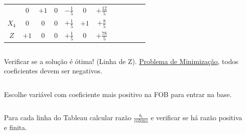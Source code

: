 \documentclass{beamer}
\begin{document}
\begin{frame}
{\begin{table}
\begin{tabular}{c c c c c c c c c c c c}
				& \cellcolor{yellow!50} $\scriptstyle 0$
				& \cellcolor{yellow!50} $\scriptstyle +1$
				& \cellcolor{yellow!50} $\scriptstyle 0$
				& \cellcolor{yellow!50} $\scriptstyle -\frac{1}{5}$			
				& \cellcolor{yellow!50} $\scriptstyle 0$
				& \cellcolor{yellow!50} $\scriptstyle +\frac{12}{5}$ \\
				\cellcolor{blue!100} \color{red} $\scriptstyle X_4$
				& \cellcolor{yellow!50} $\scriptstyle 0$
				& \cellcolor{yellow!50} $\scriptstyle 0$
				& \cellcolor{yellow!50} $\scriptstyle 0$
				& \cellcolor{yellow!50} $\scriptstyle +\frac{1}{5}$
				& \cellcolor{yellow!50} $\scriptstyle +1$
				& \cellcolor{yellow!50} $\scriptstyle +\frac{8}{5}$ \\
				\cellcolor{blue!100} \color{white} $\scriptstyle Z$
				& \cellcolor{yellow!50} $\scriptstyle +1$
				& \cellcolor{yellow!50} $\scriptstyle 0$
				& \cellcolor{yellow!50} $\scriptstyle 0$
				& \cellcolor{yellow!50} $\scriptstyle +\frac{1}{5}$
				& \cellcolor{yellow!50} $\scriptstyle 0$
				& \cellcolor{yellow!50} $\scriptstyle +\frac{78}{5}$  \\
			\end{tabular}
		\end{table}			
	}		

	{
		\begin{columns}
			\begin{column}{5cm}
				\begin{mdframed}[backgroundcolor=olive!80]
					Verificar se a solução é ótima! (Linha de Z). \underline{Problema de Minimização}, todos coeficientes devem ser negativos.
				\end{mdframed}
			\end{column}
			\begin{column}{5cm}

			\end{column}
		\end{columns}
	}	
	\only<2>
	{
		\begin{columns}
			\begin{column}{5cm}
				\begin{mdframed}[backgroundcolor=orange!80]
					Escolhe variável com coeficiente mais positivo na FOB para entrar na base.
				\end{mdframed}
			\end{column}
			\begin{column}{5cm}

			\end{column}
		\end{columns}
	}	
	\only<3>
	{
		\begin{columns}
			\begin{column}{5cm}
				\begin{mdframed}[backgroundcolor=olive!80]
					Para cada linha do Tableau calcular razão $\frac{b_i}{\text{coluna}}$ e verificar se há razão positiva e finita.
				\end{mdframed}
			\end{column}
			\begin{column}{5cm}


\end{column}
\end{columns}}
\end{frame}
\end{document}
